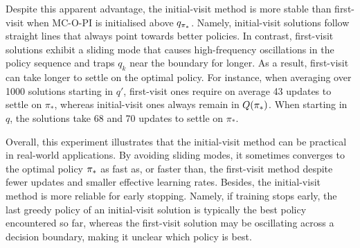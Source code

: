Despite this apparent advantage, the initial-visit method is more stable than first-visit when MC-O-PI is initialised above $q_{{\pi}_*}$.
Namely, initial-visit solutions follow straight lines that always point towards better policies.
In contrast, first-visit solutions exhibit a sliding mode that causes high-frequency oscillations in the policy sequence and traps $q_k$ near the boundary for longer.
As a result, first-visit can take longer to settle on the optimal policy.
For instance, when averaging over 1000 solutions starting in $q'$, first-visit ones require on average 43 updates to settle on $\pi_*$, whereas initial-visit ones always remain in $Q({\pi}_*)$.
When starting in $q$, the solutions take 68 and 70 updates to settle on $\pi_*$.

% 
\vspace{-0.4cm}



Overall, this experiment illustrates that the initial-visit method can be practical in real-world applications. 
By avoiding sliding modes, it sometimes converges to the optimal policy ${\pi}_*$ as fast as, or faster than, the first-visit method despite fewer updates and smaller effective learning rates.
Besides, the initial-visit method is more reliable for early stopping. Namely, if training stops early, the last greedy policy of an initial-visit solution is typically the best policy encountered so far, whereas the first-visit solution may be oscillating across a decision boundary, making it unclear which policy is best.




